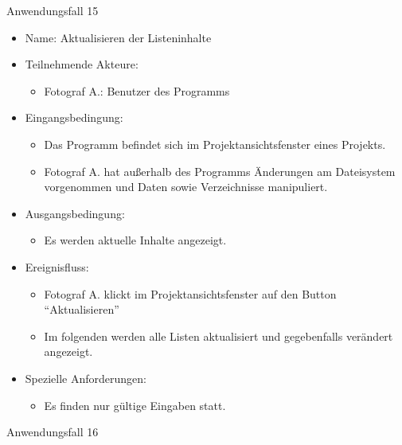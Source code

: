 \begin{itemize}
	\begin{description}
		\item[Anwendungsfall 15]
	\end{description}
	
	\begin{itemize}
		\item Name: Aktualisieren der Listeninhalte
		\item Teilnehmende Akteure:
		\begin{itemize}
			\item	Fotograf A.: Benutzer des Programms		
		\end{itemize}
		\item Eingangsbedingung:
		\begin{itemize}
			\item	Das Programm befindet sich im Projektansichtsfenster eines Projekts.
			\item Fotograf A. hat außerhalb des Programms Änderungen am Dateisystem vorgenommen und Daten sowie Verzeichnisse manipuliert.
		\end{itemize}
		\item Ausgangsbedingung:
		\begin{itemize}
			\item	Es werden aktuelle Inhalte angezeigt.	
		\end{itemize}
		\item Ereignisfluss:
		\begin{itemize}
			\item Fotograf A. klickt im Projektansichtsfenster auf den Button "`Aktualisieren"'
			\item Im folgenden werden alle Listen aktualisiert und gegebenfalls verändert angezeigt.
		\end{itemize}
		\item Spezielle Anforderungen:
		\begin{itemize}
			\item	Es finden nur gültige Eingaben statt.
		\end{itemize}			
	\end{itemize}
	
	\begin{description}
		\item[Anwendungsfall 16]
	\end{description}
	

\end{itemize}
